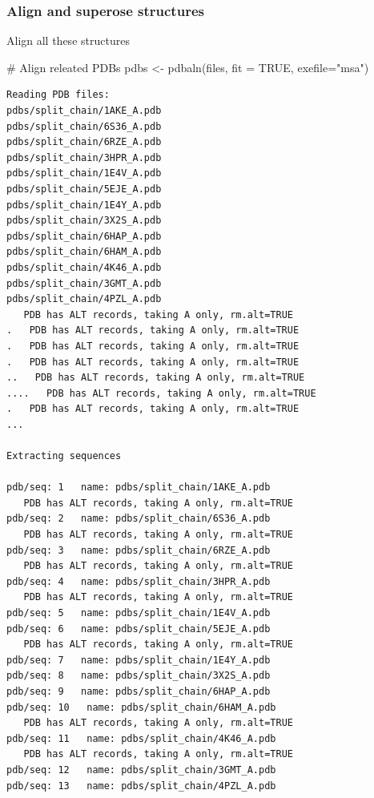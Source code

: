 \documentclass[
  letterpaper,
  DIV=11,
  numbers=noendperiod]{scrartcl}
\newenvironment{Shaded}{\begin{snugshade}}{\end{snugshade}}
\newcommand{\AttributeTok}[1]{\textcolor[rgb]{0.40,0.45,0.13}{#1}}
\newcommand{\CommentTok}[1]{\textcolor[rgb]{0.37,0.37,0.37}{#1}}
\newcommand{\ConstantTok}[1]{\textcolor[rgb]{0.56,0.35,0.01}{#1}}
\newcommand{\FunctionTok}[1]{\textcolor[rgb]{0.28,0.35,0.67}{#1}}
\newcommand{\NormalTok}[1]{\textcolor[rgb]{0.00,0.23,0.31}{#1}}
\newcommand{\OtherTok}[1]{\textcolor[rgb]{0.00,0.23,0.31}{#1}}
\newcommand{\StringTok}[1]{\textcolor[rgb]{0.13,0.47,0.30}{#1}}
\begin{document}
\hypertarget{align-and-superose-structures}{%
\subsubsection{Align and superose
structures}\label{align-and-superose-structures}}

Align all these structures

\begin{Shaded}
\begin{Highlighting}[]
\CommentTok{\# Align releated PDBs}
\NormalTok{pdbs }\OtherTok{\textless{}{-}} \FunctionTok{pdbaln}\NormalTok{(files, }\AttributeTok{fit =} \ConstantTok{TRUE}\NormalTok{, }\AttributeTok{exefile=}\StringTok{"msa"}\NormalTok{)}
\end{Highlighting}
\end{Shaded}

\begin{verbatim}
Reading PDB files:
pdbs/split_chain/1AKE_A.pdb
pdbs/split_chain/6S36_A.pdb
pdbs/split_chain/6RZE_A.pdb
pdbs/split_chain/3HPR_A.pdb
pdbs/split_chain/1E4V_A.pdb
pdbs/split_chain/5EJE_A.pdb
pdbs/split_chain/1E4Y_A.pdb
pdbs/split_chain/3X2S_A.pdb
pdbs/split_chain/6HAP_A.pdb
pdbs/split_chain/6HAM_A.pdb
pdbs/split_chain/4K46_A.pdb
pdbs/split_chain/3GMT_A.pdb
pdbs/split_chain/4PZL_A.pdb
   PDB has ALT records, taking A only, rm.alt=TRUE
.   PDB has ALT records, taking A only, rm.alt=TRUE
.   PDB has ALT records, taking A only, rm.alt=TRUE
.   PDB has ALT records, taking A only, rm.alt=TRUE
..   PDB has ALT records, taking A only, rm.alt=TRUE
....   PDB has ALT records, taking A only, rm.alt=TRUE
.   PDB has ALT records, taking A only, rm.alt=TRUE
...

Extracting sequences

pdb/seq: 1   name: pdbs/split_chain/1AKE_A.pdb 
   PDB has ALT records, taking A only, rm.alt=TRUE
pdb/seq: 2   name: pdbs/split_chain/6S36_A.pdb 
   PDB has ALT records, taking A only, rm.alt=TRUE
pdb/seq: 3   name: pdbs/split_chain/6RZE_A.pdb 
   PDB has ALT records, taking A only, rm.alt=TRUE
pdb/seq: 4   name: pdbs/split_chain/3HPR_A.pdb 
   PDB has ALT records, taking A only, rm.alt=TRUE
pdb/seq: 5   name: pdbs/split_chain/1E4V_A.pdb 
pdb/seq: 6   name: pdbs/split_chain/5EJE_A.pdb 
   PDB has ALT records, taking A only, rm.alt=TRUE
pdb/seq: 7   name: pdbs/split_chain/1E4Y_A.pdb 
pdb/seq: 8   name: pdbs/split_chain/3X2S_A.pdb 
pdb/seq: 9   name: pdbs/split_chain/6HAP_A.pdb 
pdb/seq: 10   name: pdbs/split_chain/6HAM_A.pdb 
   PDB has ALT records, taking A only, rm.alt=TRUE
pdb/seq: 11   name: pdbs/split_chain/4K46_A.pdb 
   PDB has ALT records, taking A only, rm.alt=TRUE
pdb/seq: 12   name: pdbs/split_chain/3GMT_A.pdb 
pdb/seq: 13   name: pdbs/split_chain/4PZL_A.pdb 
\end{verbatim}
\end{document}
